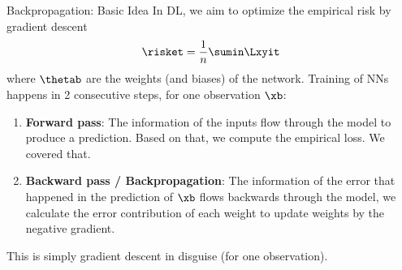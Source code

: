 \begin{frame}{Backpropagation: Basic Idea}
     In DL, we aim to optimize the empirical risk by gradient descent 
      $$\risket = \frac{1}{n} \sumin \Lxyit$$
      where $\thetab$ are the weights (and biases) of the network. 
      Training of NNs happens in 2 consecutive steps, for one observation $\xb$:
      \begin{enumerate}
        \item \textbf{Forward pass}: The information of the inputs flow through the model to produce a prediction. 
        Based on that, we compute the empirical loss. We covered that.
        \item \textbf{Backward pass / Backpropagation}: The information of the error that happened in the prediction of $\xb$ 
          flows backwards through the model, we calculate the error contribution of each weight to update weights by the negative gradient. 
      \end{enumerate}
      This is simply gradient descent in disguise (for one observation).
   
  
\end{frame}
